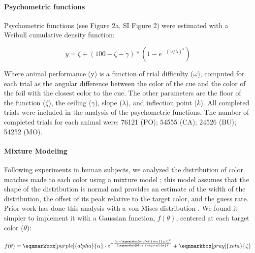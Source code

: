 \paragraph{Psychometric functions}

Psychometric functions (see Figure 2a, SI Figure 2) were estimated with a Weibull cumulative density function: %

\begin{equation} \label{eq:Weibull}
    y=\zeta+(100-\zeta-\gamma) *\left(1-e^{-(\omega / \lambda)^k}\right) 
\end{equation}

Where animal performance (y) is a function of trial difficulty ($\omega$), computed for each trial as the angular difference between the color of the cue and the color of the foil with the closest color to the cue. 
The other parameters are the floor of the function ($\zeta$), the ceiling ($\gamma$), slope ($\lambda$), and inflection point ($k$). 
All completed trials were included in the analysis of the psychometric functions. 
The number of completed trials for each animal were: 76121 (PO); 54555 (CA); 24526 (BU); 54252 (MO). 

\paragraph{Mixture Modeling}\label{para:MixtureModeling}

Following experiments in human subjects, we analyzed the distribution of color matches made to each color using a mixture model \citep{zhang_discrete_2008,bae_why_2015}; this model assumes that the shape of the distribution is normal and provides an estimate of the width of the distribution, the offset of its peak relative to the target color, and the guess rate.
Prior work has done this analysis with a von Mises distribution \citep{zhang_discrete_2008,bae_why_2015}.
We found it simpler to implement it with a Gaussian function, $f(\theta)$, centered at each target color ($\theta$):



\vspace{2em} 
\begin{equation} \label{eq:GaussianEquation}
    f(\theta) = 
    \eqnmarkbox[purple]{alpha}{\alpha}
    \cdot
    e^{
    -\frac{(x-
    \eqnmarkbox[violet]{mu}{\mu}
    )^2}{2 
    \eqnmarkbox[blue]{sigma}{\sigma}^2}}
    +
    \eqnmarkbox[gray]{zeta}{\zeta}        
\end{equation}

